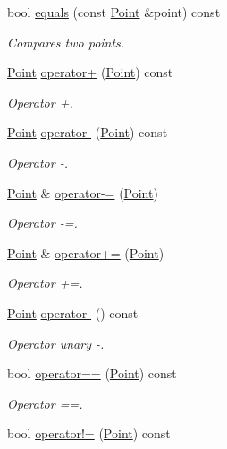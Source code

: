 \begin{DoxyCompactItemize}
bool \hyperlink{classPoint_ac05a8a1592b27bd740e3e2ec8b5b00fe}{equals} (const \hyperlink{classPoint}{Point} \&point) const 
\begin{DoxyCompactList}\small\item\em Compares two points. \end{DoxyCompactList}\item 
\hyperlink{classPoint}{Point} \hyperlink{classPoint_aa4a980a7f31a40cdf54029a3eda81dc8}{operator+} (\hyperlink{classPoint}{Point}) const 
\begin{DoxyCompactList}\small\item\em Operator +. \end{DoxyCompactList}\item 
\hyperlink{classPoint}{Point} \hyperlink{classPoint_a99f3ba7fa9ae4368a2a0ccba32aadf90}{operator-\/} (\hyperlink{classPoint}{Point}) const 
\begin{DoxyCompactList}\small\item\em Operator -\/. \end{DoxyCompactList}\item 
\hyperlink{classPoint}{Point} \& \hyperlink{classPoint_adfae003b0a76e7f55b265a33925077a9}{operator-\/=} (\hyperlink{classPoint}{Point})
\begin{DoxyCompactList}\small\item\em Operator -\/=. \end{DoxyCompactList}\item 
\hyperlink{classPoint}{Point} \& \hyperlink{classPoint_ae54aab25250505089e9d179e512b9122}{operator+=} (\hyperlink{classPoint}{Point})
\begin{DoxyCompactList}\small\item\em Operator +=. \end{DoxyCompactList}\item 
\hyperlink{classPoint}{Point} \hyperlink{classPoint_a99380b62b682c34a88713556df1287cf}{operator-\/} () const 
\begin{DoxyCompactList}\small\item\em Operator unary -\/. \end{DoxyCompactList}\item 
bool \hyperlink{classPoint_a5292afa0565b291f2c9805387caff55f}{operator==} (\hyperlink{classPoint}{Point}) const 
\begin{DoxyCompactList}\small\item\em Operator ==. \end{DoxyCompactList}\item 
bool \hyperlink{classPoint_afabdf8f492eed98971d66ef6e63a4b59}{operator!=} (\hyperlink{classPoint}{Point}) const 

\end{DoxyCompactItemize}
